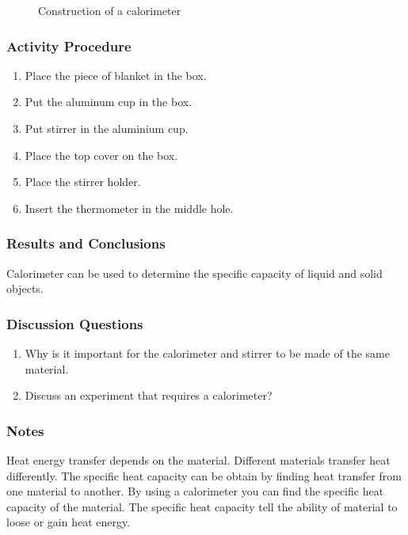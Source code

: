 \begin{figure}
\begin{center}
\def\svgwidth{350pt}

\caption{Construction of a calorimeter}
\label{fig:calorimeter}
\end{center}
\end{figure}

\subsubsection*{Activity Procedure}
\begin{enumerate}
\item{Place the piece of blanket in the box.}
\item{Put the aluminum cup in the box.}
\item{Put stirrer in the aluminium cup.}
\item{Place the top cover on the box.}
\item{Place the stirrer holder.}
\item{Insert the thermometer in the middle hole.}
\end{enumerate}

\subsubsection*{Results and Conclusions}
Calorimeter can be used to determine the specific capacity of liquid and solid objects.

\subsubsection*{Discussion Questions}
\begin{enumerate}
\item{Why is it important for the calorimeter and stirrer to be made of the same material.}
\item{Discuss an experiment that requires a calorimeter?}
\end{enumerate}

\subsubsection*{Notes}
Heat energy transfer depends on the material. Different materials transfer heat differently. The specific heat capacity can be obtain by finding heat transfer from one material to another. By using a calorimeter 
you can find the specific heat capacity of the material. The specific heat capacity tell the ability of material to loose or gain heat energy.


